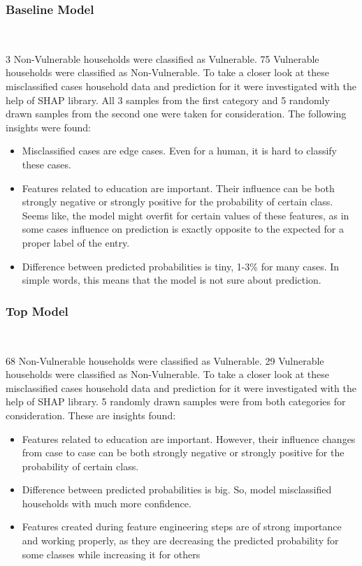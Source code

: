    \subsubsection{Baseline Model}~~~
    
    3 Non-Vulnerable households were classified as Vulnerable. 75 Vulnerable households were classified as Non-Vulnerable.
    To take a closer look at these misclassified cases household data and prediction for it were investigated with the help of SHAP library. All 3 samples from the first category and 5 randomly drawn samples from the second one were taken for consideration.
    The following insights were found:
        \begin{itemize}
            \item Misclassified cases are edge cases. Even for a human, it is hard to classify these cases.
            \item Features related to education are important. Their influence can be both strongly negative or strongly positive for the probability of certain class. Seems like, the model might overfit for certain values of these features, as in some cases influence on prediction is exactly opposite to the expected for a proper label of the entry.
            \item Difference between predicted probabilities is tiny, 1-3\% for many cases. In simple words, this means that the model is not sure about prediction.
        \end{itemize}    

    \subsubsection{Top Model}~~~

    68 Non-Vulnerable households were classified as Vulnerable. 29 Vulnerable households were classified as Non-Vulnerable.
    To take a closer look at these misclassified cases household data and prediction for it were investigated with the help of SHAP library. 5 randomly drawn samples were from both categories for consideration.
    These are insights found:
        \begin{itemize}
            \item Features related to education are important. However, their influence changes from case to case can be both strongly negative or strongly positive for the probability of certain class.
            \item Difference between predicted probabilities is big. So, model misclassified households with much more confidence.
            \item Features created during feature engineering steps are of strong importance and working properly, as they are decreasing the predicted probability for some classes while increasing it for others
        \end{itemize}
        
